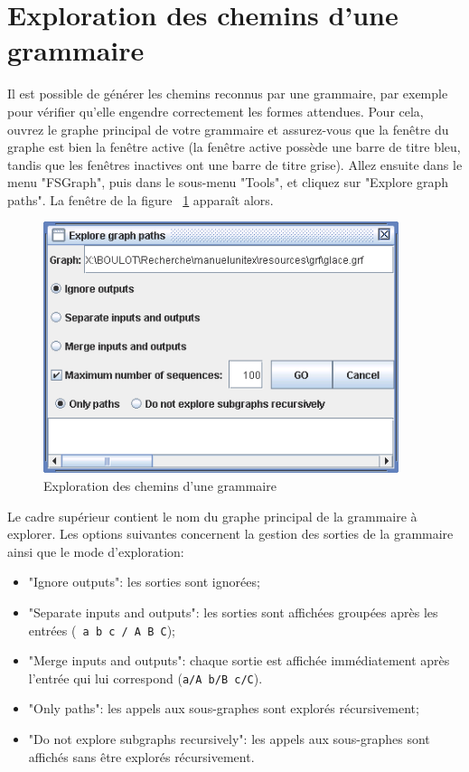 \section{Exploration des chemins d’une grammaire}

Il est possible de générer les chemins reconnus par une grammaire, par exemple pour
vérifier qu’elle engendre correctement les formes attendues. Pour cela, ouvrez le graphe
principal de votre grammaire et assurez-vous que la fenêtre du graphe est bien la fenêtre active
(la fenêtre active possède une barre de titre bleu, tandis que les fenêtres inactives ont une
barre de titre grise). Allez ensuite dans le menu "FSGraph", puis dans le sous-menu "Tools",
et cliquez sur "Explore graph paths". La fenêtre de la figure 
~\ref{fig-explore-graph-paths} apparaît alors.


\begin{figure}[!h]
\begin{center}
\includegraphics[width=10.4cm]{resources/img/fig6-18.png}
\caption{Exploration des chemins d’une grammaire\label{fig-explore-graph-paths}}
\end{center}
\end{figure}

\bigskip
\noindent Le cadre supérieur contient le nom du graphe principal de la grammaire à explorer.
Les options suivantes concernent la gestion des sorties de la grammaire ainsi que le mode
d’exploration:


\begin{itemize}
  \item "Ignore outputs": les sorties sont ignorées;
  \item "Separate inputs and outputs": les sorties sont affichées groupées après les entrées
  (\verb$ a b c / A B C$);
  \item "Merge inputs and outputs": chaque sortie est affichée immédiatement après l’entrée 
  	  qui lui correspond
  (\verb$a/A b/B c/C$).
  \item "Only paths": les appels aux sous-graphes sont explorés récursivement;
  \item "Do not explore subgraphs recursively": les appels aux sous-graphes sont affichés sans
être explorés récursivement.
\end{itemize}

